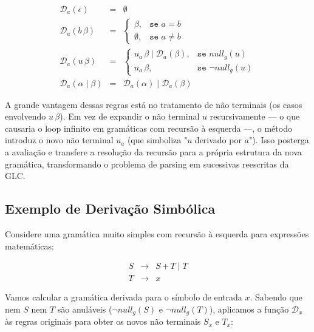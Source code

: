 \[
\begin{array}{lcl}
\mathcal{D}_a(\epsilon) & = & \emptyset \\
\mathcal{D}_a(b \, \beta) & = & \left\{ \begin{array}{ll}
                                   \beta, & \texttt{se } a = b \\
                                   \emptyset, & \texttt{se } a \neq b
                                   \end{array} \right. \\
\mathcal{D}_a(u \, \beta) & = & \left\{ \begin{array}{ll}
                                   u_a \, \beta \;|\; \mathcal{D}_a(\beta), & \texttt{se } null_g(u) \\
                                   u_a \, \beta, & \texttt{se } \neg null_g(u)
                                   \end{array} \right. \\
\mathcal{D}_a(\alpha \;|\; \beta) & = & \mathcal{D}_a(\alpha) \;|\; \mathcal{D}_a(\beta)
\end{array}
\]

A grande vantagem dessas regras está no tratamento de não terminais (os casos envolvendo $u \, \beta$). Em vez de expandir o não terminal $u$ recursivamente — o que causaria o loop infinito em gramáticas com recursão à esquerda —, o método introduz o novo não terminal $u_a$ (que simboliza "$u$ derivado por $a$"). Isso posterga a avaliação e transfere a resolução da recursão para a própria estrutura da nova gramática, transformando o problema de parsing em sucessivas reescritas da GLC.

\subsection*{Exemplo de Derivação Simbólica}

Considere uma gramática muito simples com recursão à esquerda para expressões matemáticas:

\[
\begin{array}{lcl}
S & \to & S \, \texttt{+} \, T \;|\; T \\
T & \to & x
\end{array}
\]

Vamos calcular a gramática derivada para o símbolo de entrada $x$. Sabendo que nem $S$ nem $T$ são anuláveis ($\neg null_g(S)$ e $\neg null_g(T)$), aplicamos a função $\mathcal{D}_x$ às regras originais para obter os novos não terminais $S_x$ e $T_x$:

